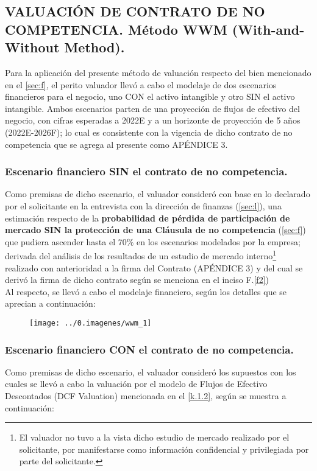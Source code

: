 \subsection{VALUACIÓN DE CONTRATO DE NO COMPETENCIA. Método WWM (With-and-Without Method).}

 Para la aplicación del presente método de valuación respecto del bien mencionado en el \autoref{sec:f}, el perito valuador llevó a cabo el modelaje de dos escenarios financieros para el negocio, uno CON el activo intangible y otro SIN el activo intangible. Ambos escenarios parten de una proyección de flujos de efectivo del negocio, con cifras esperadas a 2022E y a un horizonte de proyección de 5 años (2022E-2026F); lo cual es consistente con la vigencia de dicho contrato de no competencia que se agrega al presente como APÉNDICE 3.


\subsubsection{Escenario financiero SIN el contrato de no competencia.}

  Como premisas de dicho escenario, el valuador consideró con base en lo declarado por el solicitante en la entrevista con la dirección de finanzas (\autoref{sec:l}), una estimación respecto de la \textbf{probabilidad de pérdida de participación de mercado SIN  la protección de una Cláusula de no competencia} (\autoref{sec:f}) que pudiera ascender hasta el 70\% en los escenarios modelados por la empresa; derivada del análisis de los resultados de un estudio de mercado interno\footnote{El valuador no tuvo a la vista dicho estudio de mercado realizado por el solicitante, por manifestarse como información confidencial y privilegiada por parte del solicitante.}  realizado con anterioridad a la firma del Contrato (APÉNDICE 3) y del cual se derivó la firma de dicho contrato según se menciona en el \textcolor{secundario}{inciso F.\ref{f2}})\\
 
Al respecto, se llevó a cabo el modelaje financiero, según los detalles que se aprecian a continuación: 



\begin{figure}[H]
\centering
\texttt{[image: ../0.imagenes/wwm\_1]}
\end{figure}


\subsubsection{Escenario financiero CON el contrato de no competencia.}
  Como premisas de dicho escenario, el valuador consideró los supuestos con los cuales se llevó a cabo la valuación por el modelo de Flujos de Efectivo Descontados (DCF Valuation) mencionada en el \autoref{k.1.2}, según se muestra a continuación:

